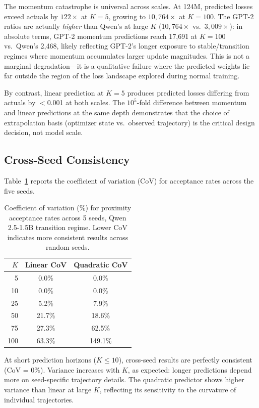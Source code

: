 \documentclass{article}
\begin{document}
The momentum catastrophe is universal across scales.
At 124M, predicted losses exceed actuals by $122\times$ at $K{=}5$, growing to $10{,}764\times$ at $K{=}100$.
The GPT-2 ratios are actually \emph{higher} than Qwen's at large $K$ ($10{,}764\times$ vs.\ $3{,}009\times$): in absolute terms, GPT-2 momentum predictions reach 17{,}691 at $K{=}100$ vs.\ Qwen's 2{,}468, likely reflecting GPT-2's longer exposure to stable/transition regimes where momentum accumulates larger update magnitudes.
This is not a marginal degradation---it is a qualitative failure where the predicted weights lie far outside the region of the loss landscape explored during normal training.

By contrast, linear prediction at $K{=}5$ produces predicted losses differing from actuals by $<$0.001 at both scales.
The $10^5$-fold difference between momentum and linear predictions at the same depth demonstrates that the choice of extrapolation basis (optimizer state vs.\ observed trajectory) is the critical design decision, not model scale.

\subsection{Cross-Seed Consistency}
\label{sec:results:consistency}

Table~\ref{tab:consistency} reports the coefficient of variation (CoV) for acceptance rates across the five seeds.

\begin{table}[h]
\centering
\caption{Coefficient of variation (\%) for proximity acceptance rates across 5 seeds, Qwen 2.5-1.5B transition regime.
Lower CoV indicates more consistent results across random seeds.}
\label{tab:consistency}
\begin{tabular}{r|cc}
\toprule
$K$ & Linear CoV & Quadratic CoV \\
\midrule
5   & 0.0\%  & 0.0\%  \\
10  & 0.0\%  & 0.0\%  \\
25  & 5.2\%  & 7.9\%  \\
50  & 21.7\% & 18.6\% \\
75  & 27.3\% & 62.5\% \\
100 & 63.3\% & 149.1\% \\
\bottomrule
\end{tabular}
\end{table}

At short prediction horizons ($K \leq 10$), cross-seed results are perfectly consistent (CoV = 0\%).
Variance increases with $K$, as expected: longer predictions depend more on seed-specific trajectory details.
The quadratic predictor shows higher variance than linear at large $K$, reflecting its sensitivity to the curvature of individual trajectories.
\end{document}
